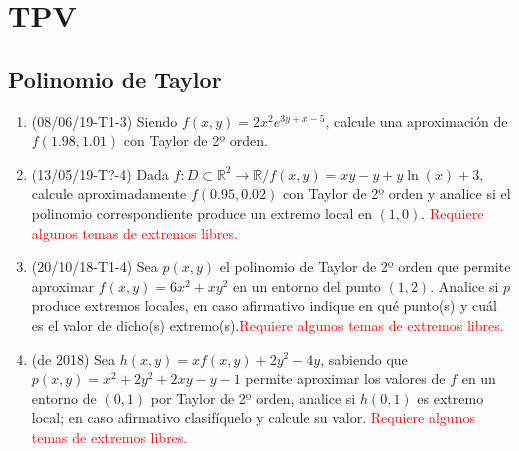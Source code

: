\documentclass[12pt,a4paper]{article}
\newcommand{\red}[1]{\textcolor{red}{#1}}
\newcommand{\R}{\mathbb{R}}
\begin{document}
\section{TPV}
\subsection{Polinomio de Taylor}
\begin{enumerate}
	\item (08/06/19-T1-3) Siendo $f ( x , y ) = 2 x^2 e^{3y+x-5}$, calcule una aproximación de $f ( 1 . 98 , 1 . 01 )$ con Taylor de 2º orden.
	
	\item (13/05/19-T?-4) Dada $f : D \subset\R^2 \rightarrow \R / f ( x , y ) = x y - y + y \ln( x ) + 3$, calcule aproximadamente $f ( 0 . 95 , 0 . 02 )$ con Taylor de 2º orden y analice si el polinomio correspondiente produce un extremo local en $ ( 1 , 0 )  $. \red{Requiere algunos temas de extremos libres.}
	
	\item (20/10/18-T1-4) Sea $p ( x , y )$ el polinomio de Taylor de 2º orden que permite aproximar $f ( x , y ) = 6 x^2 + x y^2$ en un entorno del punto $( 1 , 2 )$. Analice si $p$ produce extremos locales, en caso afirmativo indique en qué	punto(s) y cuál es el valor de dicho(s) extremo(s).\red{Requiere algunos temas de extremos libres.}
	
	\item (de 2018) Sea $h(x, y) = x f(x, y) + 2 y^2 - 4 y$, sabiendo que $p(x, y) = x^2 + 2 y^2 + 2 x y - y - 1$ permite aproximar los valores de $f$ en un entorno de $(0, 1)$ por Taylor de 2º orden, analice si $h(0, 1)$ es extremo local; en caso afirmativo clasifíquelo y calcule su valor. \red{Requiere algunos temas de extremos libres.}
\end{enumerate}
\end{document}
